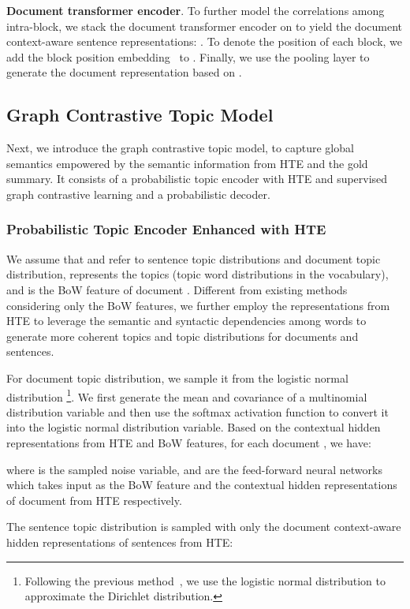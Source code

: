 \documentclass[11pt]{article}
\begin{document}
\textbf{Document transformer encoder}. To further model the correlations among intra-block, we stack the document transformer encoder on  to yield the document context-aware sentence representations: .
To denote the position of each block, we add the block position embedding~\cite{vaswani2017attention} to .
Finally, we use the pooling layer to generate the document representation  based on .

\subsection{Graph Contrastive Topic Model}
Next, we introduce the graph contrastive topic model, to capture global semantics empowered by the semantic information from HTE and the gold summary. 
It consists of a probabilistic topic encoder with HTE and supervised graph contrastive learning and a probabilistic decoder.


\subsubsection{Probabilistic Topic Encoder Enhanced with HTE}
We assume that  and  refer to sentence topic distributions and document topic distribution,  represents the topics (topic word distributions in the vocabulary), and  is the BoW feature of document .
Different from existing methods~\cite{wang2020friendly, aralikatte2021focus, fu2020document} considering only the BoW features, we further employ the representations from HTE to leverage the semantic and syntactic dependencies among words to generate more coherent topics and topic distributions for documents and sentences.

For document topic distribution, we sample it from the logistic normal distribution \footnote{\scriptsize Following the previous method~\cite{srivastava2017autoencoding}, we use the logistic normal distribution to approximate the Dirichlet distribution.}. 
We first generate the mean and covariance of a multinomial distribution variable and then use the softmax activation function to convert it into the logistic normal distribution variable. 
Based on the contextual hidden representations from HTE and BoW features, for each document , we have:

where  is the sampled noise variable,  and  are the feed-forward neural networks which takes input as the BoW feature  and the contextual hidden representations  of document  from HTE respectively.

The sentence topic distribution is sampled with only the document context-aware hidden representations of sentences from HTE:
\end{document}
